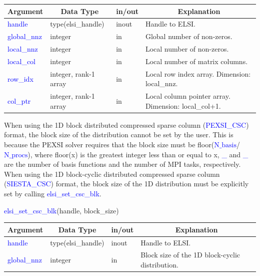 \documentclass{report}
\begin{document}
\begin{tabular}[]{|p{30mm}|p{35mm}|p{15mm}|p{85mm}|}
\hline
\multicolumn{1}{|c|}{\textbf{Argument}} & \multicolumn{1}{c|}{\textbf{Data Type}} & \multicolumn{1}{c|}{\textbf{in/out}} & \multicolumn{1}{c|}{\textbf{Explanation}}\\
\hline
\textcolor{blue}{handle}      & type(elsi\_handle)    & inout & Handle to ELSI.\\
\hline
\textcolor{blue}{global\_nnz} & integer               & in    & Global number of non-zeros.\\
\hline
\textcolor{blue}{local\_nnz}  & integer               & in    & Local number of non-zeros.\\
\hline
\textcolor{blue}{local\_col}  & integer               & in    & Local number of matrix columns.\\
\hline
\textcolor{blue}{row\_idx}    & integer, rank-1 array & in    & Local row index array.  Dimension: local\_nnz.\\
\hline
\textcolor{blue}{col\_ptr}    & integer, rank-1 array & in    & Local column pointer array.  Dimension: local\_col+1.\\
\hline
\end{tabular}

\bigskip
When using the 1D block distributed compressed sparse column (\textcolor{blue}{PEXSI\_CSC}) format, the block size of the distribution cannot be set by the user.  This is because the PEXSI solver requires that the block size must be floor(\textcolor{blue}{$\text{N}\_\text{basis}$}/\textcolor{blue}{$\text{N}\_\text{procs}$}), where floor(x) is the greatest integer less than or equal to x, \textcolor{blue}{\_} and \textcolor{blue}{\_} are the number of basis functions and the number of MPI tasks, respectively.  When using the 1D block-cyclic distributed compressed sparse column (\textcolor{blue}{SIESTA\_CSC}) format, the block size of the 1D distribution must be explicitly set by calling \textcolor{blue}{elsi\_set\_csc\_blk}.\\

\begin{labeling}{\hspace{6cm}}
\item [\hspace{0.3cm} \textcolor{blue}{elsi\_set\_csc\_blk}(handle, block\_size)]
\end{labeling}

\begin{tabular}[]{|p{30mm}|p{30mm}|p{15mm}|p{90mm}|}
\hline
\multicolumn{1}{|c|}{\textbf{Argument}} & \multicolumn{1}{c|}{\textbf{Data Type}} & \multicolumn{1}{c|}{\textbf{in/out}} & \multicolumn{1}{c|}{\textbf{Explanation}}\\
\hline
\textcolor{blue}{handle}       & type(elsi\_handle) & inout & Handle to ELSI.\\
\hline
\textcolor{blue}{global\_nnz}  & integer            & in    & Block size of the 1D block-cyclic distribution.\\
\hline
\end{tabular}
\end{document}
